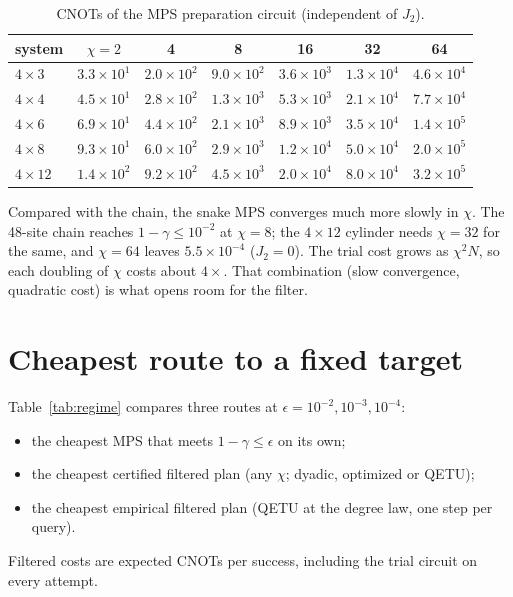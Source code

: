 \documentclass[10pt]{article}
\begin{document}
\begin{table}[h]
\centering\small
\caption{CNOTs of the MPS preparation circuit (independent of $J_2$).}
\begin{tabular}{lcccccc}
\toprule
system & $\chi=2$ & 4 & 8 & 16 & 32 & 64 \\
\midrule
$4\times3$ & $3.3\times10^{1}$ & $2.0\times10^{2}$ & $9.0\times10^{2}$ & $3.6\times10^{3}$ & $1.3\times10^{4}$ & $4.6\times10^{4}$ \\
$4\times4$ & $4.5\times10^{1}$ & $2.8\times10^{2}$ & $1.3\times10^{3}$ & $5.3\times10^{3}$ & $2.1\times10^{4}$ & $7.7\times10^{4}$ \\
$4\times6$ & $6.9\times10^{1}$ & $4.4\times10^{2}$ & $2.1\times10^{3}$ & $8.9\times10^{3}$ & $3.5\times10^{4}$ & $1.4\times10^{5}$ \\
$4\times8$ & $9.3\times10^{1}$ & $6.0\times10^{2}$ & $2.9\times10^{3}$ & $1.2\times10^{4}$ & $5.0\times10^{4}$ & $2.0\times10^{5}$ \\
$4\times12$ & $1.4\times10^{2}$ & $9.2\times10^{2}$ & $4.5\times10^{3}$ & $2.0\times10^{4}$ & $8.0\times10^{4}$ & $3.2\times10^{5}$ \\
\bottomrule
\end{tabular}
\end{table}

Compared with the chain, the snake MPS converges much more slowly in $\chi$. The 48-site chain reaches
$1-\gamma\le10^{-2}$ at $\chi=8$; the $4\times12$ cylinder needs $\chi=32$ for the same, and $\chi=64$ leaves
$5.5\times10^{-4}$ ($J_2=0$). The trial cost grows as $\chi^2N$, so each doubling of $\chi$ costs about $4\times$.
That combination (slow convergence, quadratic cost) is what opens room for the filter.

\section{Cheapest route to a fixed target}

Table~\ref{tab:regime} compares three routes at $\epsilon=10^{-2},10^{-3},10^{-4}$:
\begin{itemize}
\item the cheapest MPS that meets $1-\gamma\le\epsilon$ on its own;
\item the cheapest certified filtered plan (any $\chi$; dyadic, optimized or QETU);
\item the cheapest empirical filtered plan (QETU at the degree law, one step per query).
\end{itemize}
Filtered costs are expected CNOTs per success, including the trial circuit on every attempt.
\end{document}
